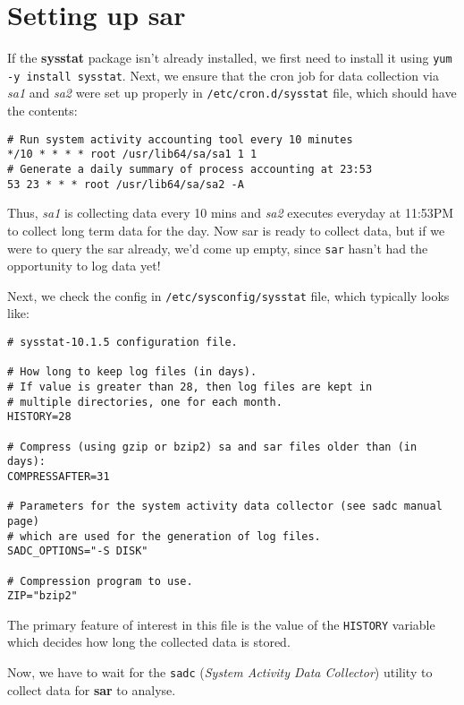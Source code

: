 \section{Setting up sar}
If the \textbf{sysstat} package isn't already installed, we first need to install it using \verb|yum -y install sysstat|. Next, we ensure that the cron job for data collection via \textit{sa1} and \textit{sa2} were set up properly in \verb|/etc/cron.d/sysstat| file, which should have the contents:

\vspace{-15pt}
\begin{verbatim}
# Run system activity accounting tool every 10 minutes
*/10 * * * * root /usr/lib64/sa/sa1 1 1
# Generate a daily summary of process accounting at 23:53
53 23 * * * root /usr/lib64/sa/sa2 -A
\end{verbatim}
\vspace{-10pt}	

\noindent
Thus, \textit{sa1} is collecting data every 10 mins and \textit{sa2} executes everyday at 11:53PM to collect long term data for the day. Now sar is ready to collect data, but if we were to query the sar already, we'd come up empty, since \verb|sar| hasn't had the opportunity to log data yet! 

Next, we check the config in \verb|/etc/sysconfig/sysstat| file, which typically looks like:

\vspace{-15pt}
\begin{verbatim}
# sysstat-10.1.5 configuration file.

# How long to keep log files (in days).
# If value is greater than 28, then log files are kept in
# multiple directories, one for each month.
HISTORY=28

# Compress (using gzip or bzip2) sa and sar files older than (in days):
COMPRESSAFTER=31

# Parameters for the system activity data collector (see sadc manual page)
# which are used for the generation of log files.
SADC_OPTIONS="-S DISK"

# Compression program to use.
ZIP="bzip2"
\end{verbatim}
\vspace{-10pt}	

\noindent
The primary feature of interest in this file is the value of the \verb|HISTORY| variable which decides how long the collected data is stored. 

Now, we have to wait for the \verb|sadc| (\textit{System Activity Data Collector}) utility to collect data for \textbf{sar} to analyse. 

